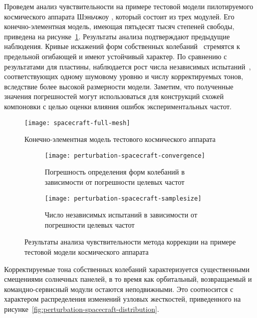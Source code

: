 Проведем анализ чувствительности на примере тестовой модели пилотируемого космического аппарата Шэньчжоу \cite{lib:misc:Shenzhou}, который состоит из трех модулей. Его конечно-элементная модель, имеющая пятьдесят тысяч степеней свободы, приведена на рисунке~\ref{fig:spacecraft-full-mesh}. Результаты анализа подтверждают предыдущие наблюдения. Кривые искажений форм собственных колебаний~ стремятся к предельной огибающей и имеют устойчивый характер. По сравнению с результатами для пластины, наблюдается рост числа независимых испытаний~, соответствующих одному шумовому уровню и числу корректируемых тонов, вследствие более высокой размерности модели. Заметим, что полученные значения погрешностей могут использоваться для конструкций схожей компоновки с целью оценки влияния ошибок экспериментальных частот.

\begin{figure}[H]
	\centering
	\texttt{[image: spacecraft-full-mesh]}
	\caption{Конечно-элементная модель тестового космического аппарата} \label{fig:spacecraft-full-mesh}
\end{figure}

\begin{figure}[!htb]
	\begin{subfigure}[b]{0.46\textwidth}
		\texttt{[image: perturbation-spacecraft-convergence]}
		\caption{Погрешность определения форм колебаний в зависимости от погрешности целевых частот} \label{fig:perturbation-spacecraft-convergence}
	\end{subfigure}
	\hfill
	\begin{subfigure}[b]{0.48\textwidth}
		\texttt{[image: perturbation-spacecraft-samplesize]}
		\caption{Число независимых испытаний в зависимости от погрешности целевых частот} \label{fig:perturbation-spacecraft-samplesize}
	\end{subfigure}
	\caption{Результаты анализа чувствительности метода коррекции на примере тестовой модели космического аппарата} \label{fig:spacecraft-plate}
\end{figure}

Корректируемые тона собственных колебаний характеризуется существенными смещениями солнечных панелей, в то время как орбитальный, возвращаемый и командно-сервисный модули остаются неподвижными. Это соотносится с характером распределения изменений узловых жесткостей, приведенного на рисунке~\ref{fig:perturbation-spacecraft-distribution}.

